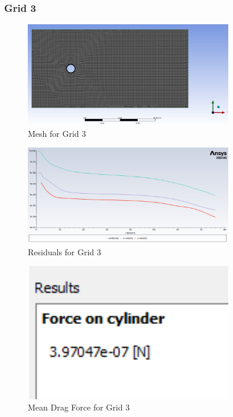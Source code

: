 \subsubsection*{Grid 3}
\begin{figure}[H]
    \centering
    \includegraphics[width=0.8\textwidth]{Questions/Figures/mesh with grid 3.png}
    \caption{Mesh for Grid 3}
\end{figure}
\begin{figure}[H]
    \centering
    \includegraphics[width=0.8\textwidth]{Questions/Figures/residuals grid 3.png}
    \caption{Residuals for Grid 3}
\end{figure}
\begin{figure}[H]
    \centering
    \includegraphics[width=0.8\textwidth]{Questions/Figures/force on cylinder grid 3.png}
    \caption{Mean Drag Force for Grid 3}
\end{figure}
